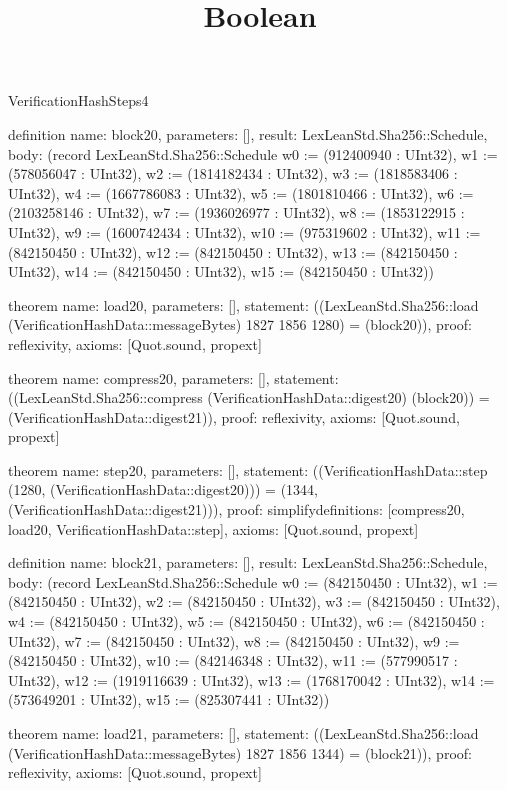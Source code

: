 \begin{lexlean}{VerificationHashSteps4}
\title{Boolean}
\begin{semanticmodule}

definition{
  name: block20,
  parameters: [],
  result: LexLeanStd.Sha256::Schedule,
  body: (record LexLeanStd.Sha256::Schedule {w0 := (912400940 : UInt32), w1 := (578056047 : UInt32), w2 := (1814182434 : UInt32), w3 := (1818583406 : UInt32), w4 := (1667786083 : UInt32), w5 := (1801810466 : UInt32), w6 := (2103258146 : UInt32), w7 := (1936026977 : UInt32), w8 := (1853122915 : UInt32), w9 := (1600742434 : UInt32), w10 := (975319602 : UInt32), w11 := (842150450 : UInt32), w12 := (842150450 : UInt32), w13 := (842150450 : UInt32), w14 := (842150450 : UInt32), w15 := (842150450 : UInt32)})
}

theorem{
  name: load20,
  parameters: [],
  statement: ((LexLeanStd.Sha256::load (VerificationHashData::messageBytes) 1827 1856 1280) = (block20)),
  proof: reflexivity{},
  axioms: [Quot.sound, propext]
}

theorem{
  name: compress20,
  parameters: [],
  statement: ((LexLeanStd.Sha256::compress (VerificationHashData::digest20) (block20)) = (VerificationHashData::digest21)),
  proof: reflexivity{},
  axioms: [Quot.sound, propext]
}

theorem{
  name: step20,
  parameters: [],
  statement: ((VerificationHashData::step (1280, (VerificationHashData::digest20))) = (1344, (VerificationHashData::digest21))),
  proof: simplify{definitions: [compress20, load20, VerificationHashData::step]},
  axioms: [Quot.sound, propext]
}

definition{
  name: block21,
  parameters: [],
  result: LexLeanStd.Sha256::Schedule,
  body: (record LexLeanStd.Sha256::Schedule {w0 := (842150450 : UInt32), w1 := (842150450 : UInt32), w2 := (842150450 : UInt32), w3 := (842150450 : UInt32), w4 := (842150450 : UInt32), w5 := (842150450 : UInt32), w6 := (842150450 : UInt32), w7 := (842150450 : UInt32), w8 := (842150450 : UInt32), w9 := (842150450 : UInt32), w10 := (842146348 : UInt32), w11 := (577990517 : UInt32), w12 := (1919116639 : UInt32), w13 := (1768170042 : UInt32), w14 := (573649201 : UInt32), w15 := (825307441 : UInt32)})
}

theorem{
  name: load21,
  parameters: [],
  statement: ((LexLeanStd.Sha256::load (VerificationHashData::messageBytes) 1827 1856 1344) = (block21)),
  proof: reflexivity{},
  axioms: [Quot.sound, propext]
}


\end{semanticmodule}
\end{lexlean}
